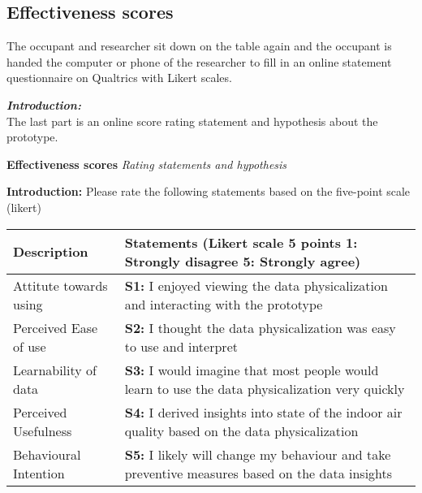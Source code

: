 \begin{appendices}
\section{Effectiveness scores}
\label{appendix:effectiveness}

The occupant and researcher sit down on the table again and the occupant is handed the computer or phone of the researcher to fill in an online statement questionnaire on Qualtrics with Likert scales. \\

\raggedright \textit{\textbf{Introduction:}} \\ The last part is an online score rating statement and hypothesis about the prototype. 

\vspace{5pt}

\begin{table}[htbp]
    \captionsetup{justification=raggedright,singlelinecheck=false}
    \raggedright \textbf{Effectiveness scores} \textit{Rating statements and hypothesis} \\
    \label{tab:column_widths}
    \raggedright \textbf{Introduction:} Please rate the following statements based on the five-point scale (likert)
    \begin{tabularx}{\textwidth}{|p{}|X|}
        \hline
        \textbf{Description} & \textbf{Statements (Likert scale 5 points 1: Strongly disagree 5: Strongly agree)} \\
        \hline        
        \hline
        Attitute towards using & \textbf{S1:} I enjoyed viewing the data physicalization and interacting with the prototype \\
        \hline
        Perceived Ease of use & \textbf{S2:} I thought the data physicalization was easy to use and interpret \\
        \hline
        Learnability of data & \textbf{S3:} I would imagine that most people would learn to use the data physicalization very quickly \\
        \hline
        Perceived Usefulness & \textbf{S4:} I derived insights into state of the indoor air quality based on the data physicalization \\
        \hline
        Behavioural Intention & \textbf{S5:} I likely will change my behaviour and take preventive measures based on the data insights \\        
        \hline
    \end{tabularx}
\end{table}


\end{appendices}
